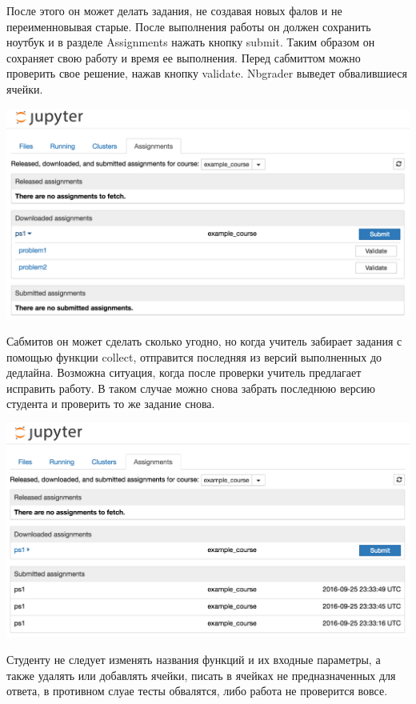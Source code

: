 \documentclass[a4paper,12pt]{article}
\begin{document}
После этого он может делать задания, не создавая новых фалов и не переименновывая старые. После выполнения работы он должен сохранить ноутбук и в разделе Assignments нажать кнопку submit. Таким образом он сохраняет свою работу и время ее выполнения. Перед сабмиттом можно проверить свое решение, нажав кнопку validate. Nbgrader выведет обвалившиеся ячейки.

\includegraphics[width=\textwidth]{assignment_list_downloaded_expanded}

Сабмитов он может сделать сколько угодно, но когда учитель забирает задания с помощью функции collect, отправится последняя из версий выполненных до дедлайна. Возможна ситуация, когда после проверки учитель предлагает исправить работу. В таком случае можно снова забрать последнюю версию студента и проверить то же задание снова.

\includegraphics[width=\textwidth]{assignment_list_submitted_again}

Студенту не следует изменять названия функций и их входные параметры, а также удалять или добавлять ячейки, писать в ячейках не предназначенных для ответа, в противном слуае тесты обвалятся, либо работа не проверится вовсе.
\end{document}
